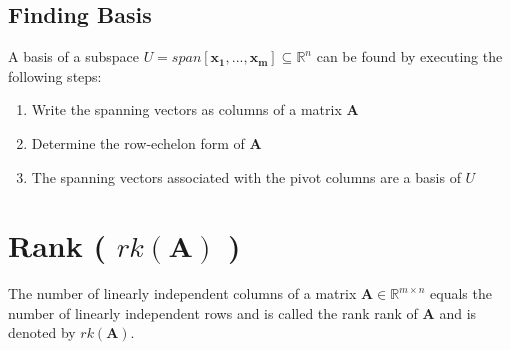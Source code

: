 \subsection{Finding Basis \cite{mfml-1}}
A basis of a subspace $U = span[\mathbf{x_1, ..., x_m}] \subseteq \mathbb{R}^n$ can be found by executing the following steps:
\begin{enumerate}
    \item Write the spanning vectors as columns of a matrix $\mathbf{A}$
    \item Determine the row-echelon form of $\mathbf{A}$
    \item The spanning vectors associated with the pivot columns are a basis of $U$
\end{enumerate}


\section{Rank ( $rk(\mathbf{A})$ ) \cite{mfml-1}}\label{matrix: Rank}

The number of linearly independent columns of a matrix $\mathbf{A} \in \mathbb{R}^{m \times n}$ equals the number of linearly independent rows and is called the rank rank of $\mathbf{A}$ and is denoted by $rk(\mathbf{A})$.

